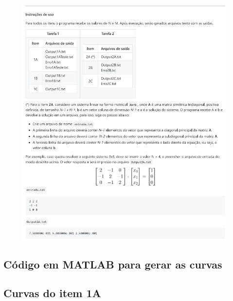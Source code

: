 \documentclass[12pt]{article}
\begin{document}
\begin{spacing}{1.5}
\begin{figure}[ht!]
    \centering
    \includegraphics[width=1\linewidth]{README_pg2.png}
    \label{fig:readme_pg2}
\end{figure}

\clearpage
\subsection{Código em MATLAB para gerar as curvas}\label{cod_MATLAB}


\newpage



\clearpage
\subsection{Curvas do item 1A} \label{curvas1A}




\end{spacing}
\end{document}
